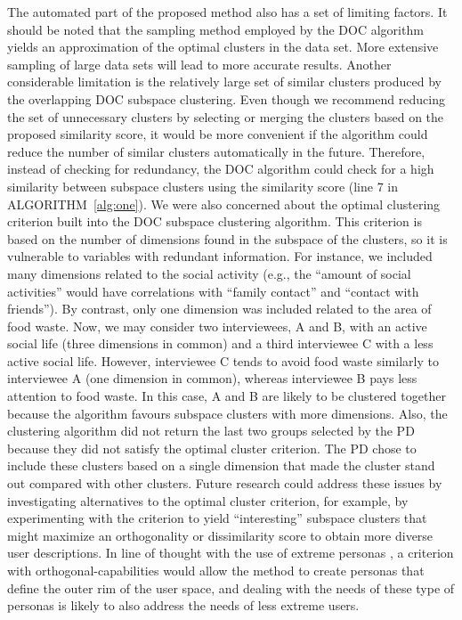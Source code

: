 The automated part of the proposed method also has a set of limiting factors. It should be noted that the sampling method employed by the DOC algorithm yields an approximation of the optimal clusters in the data set. More extensive sampling of large data sets will lead to more accurate results. Another considerable limitation is the relatively large set of similar clusters produced by the overlapping DOC subspace clustering. Even though we recommend reducing the set of unnecessary clusters by selecting or merging the clusters based on the proposed similarity score, it would be more convenient if the algorithm could reduce the number of similar clusters automatically in the future. Therefore, instead of checking for redundancy, the DOC algorithm could check for a high similarity between subspace clusters using the similarity score (line 7 in ALGORITHM~\ref{alg:one}). We were also concerned about the optimal clustering criterion built into the DOC subspace clustering algorithm. This criterion is based on the number of dimensions found in the subspace of the clusters, so it is vulnerable to variables with redundant information. For instance, we included many dimensions related to the social activity (e.g., the ``amount of social activities'' would have correlations with ``family contact'' and ``contact with friends''). By contrast, only one dimension was included related to the area of food waste. Now, we may consider two interviewees, A and B, with an active social life (three dimensions in common) and a third interviewee C with a less active social life. However, interviewee C tends to avoid food waste similarly to interviewee A (one dimension in common), whereas interviewee B pays less attention to food waste. In this case, A and B are likely to be clustered together because the algorithm favours subspace clusters with more dimensions. Also, the clustering algorithm did not return the last two groups selected by the PD because they did not satisfy the optimal cluster criterion. The PD chose to include these clusters based on a single dimension that made the cluster stand out compared with other clusters. Future research could address these issues by investigating alternatives to the optimal cluster criterion, for example, by experimenting with the criterion to yield ``interesting'' subspace clusters that might maximize an orthogonality or dissimilarity score to obtain more diverse user descriptions. In line of thought with the use of extreme personas \citep{Djajadiningrat2000}, a criterion with orthogonal-capabilities would allow the method to create personas that define the outer rim of the user space, and dealing with the needs of these type of personas is likely to also address the needs of less extreme users.

